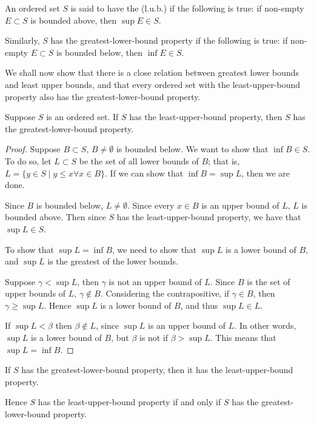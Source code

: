 \begin{definition}
An ordered set $S$ is said to have the  (l.u.b.) if the following is true: if non-empty $E\subset S$ is bounded above, then $\sup E\in S$.

Similarly, $S$ has the greatest-lower-bound property if the following is true: if non-empty $E\subset S$ is bounded below, then $\inf E\in S$.
\end{definition}

We shall now show that there is a close relation between greatest lower bounds and least upper bounds, and that every ordered set with the least-upper-bound property also has the greatest-lower-bound property.

\begin{theorem}
Suppose $S$ is an ordered set. If $S$ has the least-upper-bound property, then $S$ has the greatest-lower-bound property.
\end{theorem}

\begin{proof}
Suppose $B\subset S$, $B\neq\emptyset$ is bounded below. We want to show that $\inf B\in S$. To do so, let $L\subset S$ be the set of all lower bounds of $B$; that is, $L=\{y\in S\mid y\le x\forall x\in B\}$. If we can show that $\inf B=\sup L$, then we are done.

Since $B$ is bounded below, $L\neq\emptyset$. Since every $x\in B$ is an upper bound of $L$, $L$ is bounded above. Then since $S$ has the least-upper-bound property, we have that $\sup L\in S$.

To show that $\sup L=\inf B$, we need to show that $\sup L$ is a lower bound of $B$, and $\sup L$ is the greatest of the lower bounds.

Suppose $\gamma<\sup L$, then $\gamma$ is not an upper bound of $L$. Since $B$ is the set of upper bounds of $L$, $\gamma\notin B$. Considering the contrapositive, if $\gamma\in B$, then $\gamma\ge\sup L$. Hence $\sup L$ is a lower bound of $B$, and thus $\sup L\in L$.

If $\sup L<\beta$ then $\beta\notin L$, since $\sup L$ is an upper bound of $L$. In other words, $\sup L$ is a lower bound of $B$, but $\beta$ is not if $\beta>\sup L$. This means that $\sup L=\inf B$.
\end{proof}

\begin{corollary}
If $S$ has the greatest-lower-bound property, then it has the least-upper-bound property.

Hence $S$ has the least-upper-bound property if and only if $S$ has the greatest-lower-bound property.
\end{corollary}

